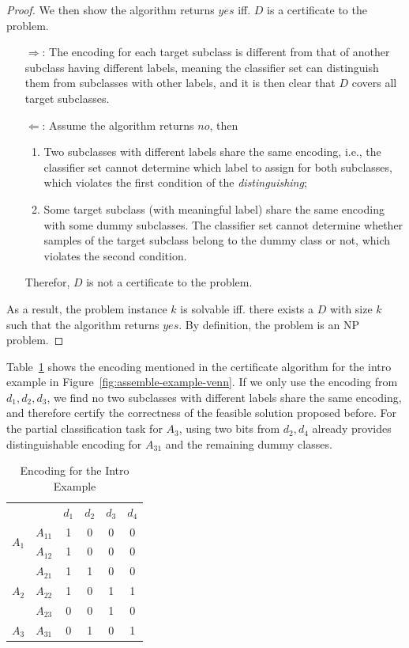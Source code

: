 \documentclass[sigplan,10pt,review]{acmart}\settopmatter{printfolios=true,printccs=false,printacmref=false}
\begin{document}
\begin{proof}
We then show the algorithm returns $yes$ iff. $D$ is a certificate to the problem.
\begin{enumerate}
	\item[$\Rightarrow$:]
	The encoding for each target subclass is different from that of another subclass having different labels, meaning the classifier set can distinguish them from subclasses with other labels, and it is then clear that $D$ covers all target subclasses.
	\item[$\Leftarrow$:]
	Assume the algorithm returns $no$, then
	\begin{enumerate}
		\item Two subclasses with different labels share the same encoding, i.e., the classifier set cannot determine which label to assign for both subclasses, which violates the first condition of the \textit{distinguishing};
		\item Some target subclass (with meaningful label) share the same encoding with some dummy subclasses.
		The classifier set cannot determine whether samples of the target subclass belong to the dummy class or not, which violates the second condition.
	\end{enumerate}
	Therefor, $D$ is not a certificate to the problem.
\end{enumerate}
As a result, the problem instance $k$ is solvable iff. there exists a $D$ with size $k$ such that the algorithm returns $yes$.
By definition, the problem is an NP problem.
\end{proof}

Table~\ref{tab:assemble-example-encoding} shows the encoding mentioned in the certificate algorithm for the intro example in Figure~\ref{fig:assemble-example-venn}.
If we only use the encoding from $d_1, d_2, d_3$, we find no two subclasses with different labels share the same encoding, and therefore certify the correctness of the feasible solution proposed before.
For the partial classification task for $A_3$, using two bits from $d_2, d_4$ already provides distinguishable encoding for $A_{31}$ and the remaining dummy classes.

\begin{table}[h]
	\begin{tabular}{|c|c|cccc|}
	\cline{1-6}
	\multicolumn{2}{|c|}{} & $d_1$ & $d_2$ & $d_3$ & $d_4$ \\ \cline{1-6}
	\multirow{2}{*}{$A_1$} & $A_{11}$ & 1 & 0 & 0 & 0 \\ \cline{2-6}
	 & $A_{12}$ & 1 & 0 & 0 & 0 \\ \cline{1-6}
	\multirow{3}{*}{$A_2$} & $A_{21}$ & 1 & 1 & 0 & 0 \\ \cline{2-6}
	 & $A_{22}$ & 1 & 0 & 1 & 1 \\ \cline{2-6}
	 & $A_{23}$ & 0 & 0 & 1 & 0 \\ \cline{1-6}
	$A_3$ & $A_{31}$ & 0 & 1 & 0 & 1 \\ \cline{1-6}
	\end{tabular}
	\caption{Encoding for the Intro Example}
	\label{tab:assemble-example-encoding}
\end{table}
\end{document}
